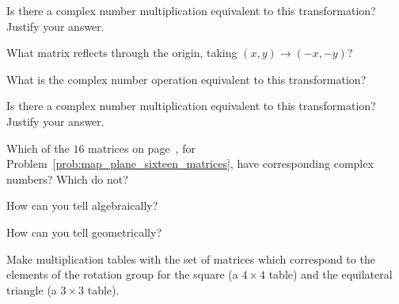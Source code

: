 \documentclass[../gatm_answers.tex]{subfiles}
\begin{document}
\begin{inner_problem}
\item Is there a complex number multiplication equivalent to this transformation? Justify your answer.
\end{inner_problem}

\begin{outer_problem}
\item 
\end{outer_problem}

\begin{inner_problem}[start=1]
\item What matrix reflects through the origin, taking $(x,y)\to (-x,-y)$?
\end{inner_problem}

\begin{inner_problem}
\item What is the complex number operation equivalent to this transformation?
\end{inner_problem}

\begin{inner_problem}
\item Is there a complex number multiplication equivalent to this transformation? Justify your answer.
\end{inner_problem}

\begin{outer_problem}
\item 
\end{outer_problem}

\begin{inner_problem}[start=1]
\item Which of the $16$ matrices on page~\pageref{prob:map_plane_sixteen_matrices}, for Problem~\ref{prob:map_plane_sixteen_matrices}, have corresponding complex numbers? Which do not?
\end{inner_problem}

\begin{inner_problem}
\item How can you tell algebraically?
\end{inner_problem}

\begin{inner_problem}
\item How can you tell geometrically?
\end{inner_problem}

\begin{outer_problem}
\item Make multiplication tables with the set of matrices which correspond to the elements of the rotation group for the square (a $4\times 4$ table) and the equilateral triangle (a $3\times 3$ table).
\end{outer_problem}
\end{document}

